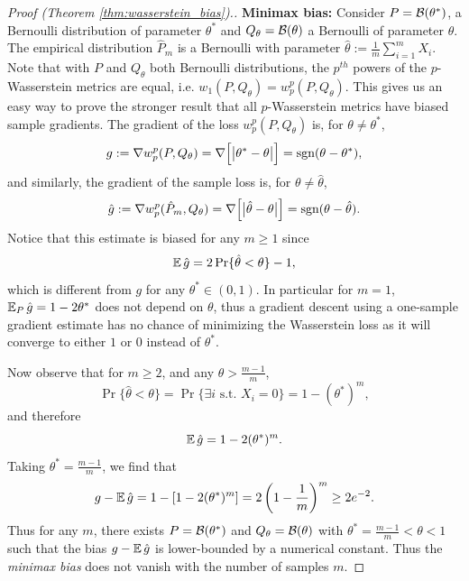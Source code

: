 \documentclass{article}
\def \sgn {\text{sgn}}
\def \Qtheta {Q_\theta}
\begin{document}
\begin{proof}[Proof (Theorem \ref{thm:wasserstein_bias}).]
{\bf Minimax bias:} 
Consider $P={\cal B}(\theta^*)$, a Bernoulli distribution of parameter $\theta^*$ and $Q_\theta={\cal B}(\theta)$ a Bernoulli of parameter $\theta$. The empirical distribution $\hat P_m$ is a Bernoulli with parameter $\hat \theta := \tfrac{1}{m} \sum\nolimits_{i=1}^m X_i$. 
Note that with $P$ and $\Qtheta$ both Bernoulli distributions, the $p^{th}$ powers of the $p$-Wasserstein metrics are equal, i.e. $w_1(P, \Qtheta) = w^p_p(P, \Qtheta)$. This gives us an easy way to prove the stronger result that all $p$-Wasserstein metrics have biased sample gradients.
The gradient of the loss $w^p_p(P,Q_\theta)$ is, for $\theta\neq\theta^*$, 
\begin{equation*}
g := \grad w^p_p(P, Q_\theta) = \nabla \Big[ \big| \theta^*-\theta\big| \Big] = \sgn(\theta - \theta^*),
\end{equation*}
and similarly, the gradient of the sample loss is, for $\theta\neq\hat \theta$, 
$$
\hat g := \grad w_p^p(\hat P_m, Q_\theta) = \nabla \Big[ \big| \hat \theta-\theta\big| \Big] = \sgn(\theta - \hat \theta).
$$
Notice that this estimate is biased for any $m\geq 1$ since
\begin{equation}\label{eqn:expected_sample_wasserstein_gradient}
\expect\hat g = 2 \Pr \{ \hat \theta < \theta \} - 1,
\end{equation}
which is different from $g$ for any $\theta^*\in (0,1)$. In particular for $m=1$, $\expects_P \hat g = 1 - 2 \theta^*$ does not depend on $\theta$, thus a gradient descent using a one-sample gradient estimate has no chance of minimizing the Wasserstein loss as it will converge to either $1$ or $0$ instead of $\theta^*$.

Now observe that for $m\geq 2$, and any $\theta > \tfrac{m - 1}{m}$,
\begin{equation*}
\Pr \{ \hat \theta < \theta \} = \Pr \{ \exists i \text{ s.t. } X_i = 0 \} = 1 - (\theta^*)^m,
\end{equation*}
and therefore
\begin{equation*}
\expect\hat g = 1 - 2 (\theta^*)^m.
\end{equation*}
Taking $\theta^* = \tfrac{m-1}{m}$, we find that
\begin{equation*}
g - \expect \hat g = 1 - \left [ 1 - 2(\theta^*)^m \right ] = 2\left(1 - \frac{1}{m}\right )^{m} \ge 2e^{-2} .
\end{equation*}
Thus for any $m$, there exists $P={\cal B}(\theta^*)$ and $Q_\theta={\cal B}(\theta)$ with $\theta^*=\frac{m-1}{m}<\theta<1$ such that the bias $g - \expect \hat g$ is lower-bounded by a numerical constant.  Thus the {\em minimax bias} does not vanish with the number of samples $m$.


\end{proof}
\end{document}
